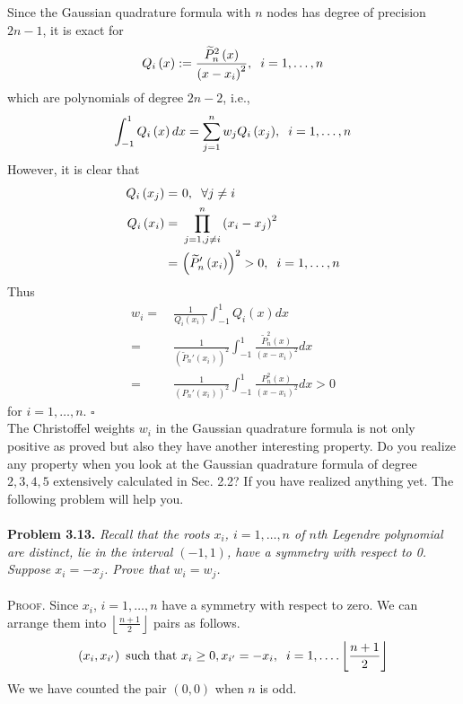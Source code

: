 \documentclass[a4paper]{article}
\numberwithin{equation}{section}
\begin{document}
Since the Gaussian quadrature formula with $n$ nodes has degree of precision $2n-1$, it is exact for
\begin{align}
{Q_i}\left( x \right): = \frac{{\widetilde P_n^2\left( x \right)}}{{{{\left( {x - {x_i}} \right)}^2}}},\hspace{0.2cm} i = 1, \ldots ,n
\end{align}
which are polynomials of degree $2n-2$, i.e.,
\begin{align}
\int_{-1}^1 {{Q_i}\left( x \right)dx}  = \sum\limits_{j = 1}^n {{w_j}{Q_i}\left( {{x_j}} \right)} ,\hspace{0.2cm}i = 1, \ldots ,n
\end{align}
However, it is clear that
\begin{align}
{Q_i}\left( {{x_j}} \right) =&\ 0,\hspace{0.2cm}\forall j \ne i\\
{Q_i}\left( {{x_i}} \right) =&\ \prod\limits_{j = 1,j \ne i}^n {{{\left( {{x_i} - {x_j}} \right)}^2}} \\
 =&\ {\left( {{\widetilde P_n}'\left( {{x_i}} \right)} \right)^2} > 0,\hspace{0.2cm}i = 1, \ldots ,n
\end{align}
Thus
\begin{align}
\label{3.98}
{w_i} =&\ \frac{1}{{{Q_i}\left( {{x_i}} \right)}}\int_{ - 1}^1 {{Q_i}\left( x \right)dx} \\
=&\ \frac{1}{{{{\left( {{\widetilde P_n}'\left( {{x_i}} \right)} \right)}^2}}}\int_{ - 1}^1 {\frac{{\widetilde P_n^2\left( x \right)}}{{{{\left( {x - {x_i}} \right)}^2}}}dx} \\
 =&\ \frac{1}{{{{\left( {{P_n}'\left( {{x_i}} \right)} \right)}^2}}}\int_{ - 1}^1 {\frac{{P_n^2\left( x \right)}}{{{{\left( {x - {x_i}} \right)}^2}}}dx}  > 0 \label{3.100}
\end{align}
for $i = 1, \ldots ,n$. \hfill $\square$\\

The Christoffel weights $w_i$ in the Gaussian quadrature formula is not only positive as proved but also they have another interesting property. Do you realize any property when you look at the  Gaussian quadrature formula of degree $2,3,4,5$ extensively calculated in Sec. 2.2? If you have realized anything yet. The following problem will help you.\\
\\ 
\textbf{Problem 3.13.} \textit{Recall that the roots $x_i$, $i=1,\ldots,n$ of $n$th Legendre polynomial are distinct, lie in the interval $\left(-1,1\right)$, have a symmetry with respect to 0. Suppose $x_i=-x_j$. Prove that $w_i=w_j$.}\\
\\
\textsc{Proof.} Since $x_i$, $i=1,\ldots,n$ have a symmetry with respect to zero. We can arrange them into $\left\lfloor {\frac{{n + 1}}{2}} \right\rfloor $ pairs as follows.
\begin{align}
\left( {{x_i},{x_{i'}}} \right) \mbox{ such that }{x_i} \ge 0,{x_{i'}} =  - {x_i},\hspace{0.2cm} i = 1, \ldots .\left\lfloor {\frac{{n + 1}}{2}} \right\rfloor 
\end{align}
We we have counted the pair $\left(0,0\right)$ when $n$ is odd.
\end{document}

